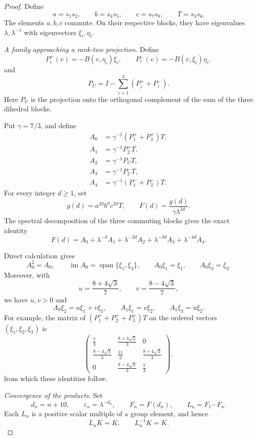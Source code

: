 \documentclass[11pt,reqno]{amsart}
\theoremstyle{plain}
\theoremstyle{definition}
\theoremstyle{remark}
\numberwithin{equation}{section}
\begin{document}
\begin{proof}
Define
\[
a=s_1s_2,
\qquad
b=s_4s_5,
\qquad
c=s_7s_8,
\qquad
T=s_3s_6.
\]
The elements $a,b,c$ commute. On their respective blocks,
they have eigenvalues $\lambda,\lambda^{-1}$ with
eigenvectors $\xi_i,\eta_i$.

\medskip
\noindent\textit{A family approaching a rank-two projection.}
Define
\[
P_i^+(v)=-B(v,\eta_i)\xi_i,
\qquad
P_i^-(v)=-B(v,\xi_i)\eta_i,
\]
and
\[
P_U=I-\sum_{i=1}^{3}(P_i^++P_i^-).
\]
Here $P_U$ is the projection onto the orthogonal complement of
the sum of the three dihedral blocks.

Put $\gamma=7/3$, and define
\[
\begin{aligned}
A_0&=\gamma^{-1}(P_1^++P_3^+)T,\\
A_1&=\gamma^{-1}P_2^+T,\\
A_2&=\gamma^{-1}P_UT,\\
A_3&=\gamma^{-1}P_2^-T,\\
A_4&=\gamma^{-1}(P_1^-+P_3^-)T.
\end{aligned}
\]
For every integer $d\ge1$, set
\[
g(d)=a^{2d}b^dc^{2d}T,
\qquad
F(d)=\frac{g(d)}{\gamma\lambda^{2d}}.
\]
The spectral decomposition of the three commuting blocks gives
the exact identity
\begin{equation}\label{eq:nonexposed-factor-expansion}
F(d)=
A_0+\lambda^{-d}A_1+\lambda^{-2d}A_2
+\lambda^{-3d}A_3+\lambda^{-4d}A_4.
\end{equation}

Direct calculation gives
\begin{equation}\label{eq:nonexposed-projection}
A_0^2=A_0,
\qquad
\operatorname{im}A_0=\operatorname{span}\{\xi_1,\xi_3\},
\qquad
A_0\xi_1=\xi_1,
\qquad
A_0\xi_3=\xi_3.
\end{equation}
Moreover, with
\[
u=\frac{8+4\sqrt3}{7},
\qquad
v=\frac{8-4\sqrt3}{7},
\]
we have $u,v>0$ and
\begin{equation}\label{eq:nonexposed-transitions}
A_0\xi_2=u\xi_1+v\xi_3,
\qquad
A_1\xi_1=v\xi_2,
\qquad
A_1\xi_3=u\xi_2.
\end{equation}
For example, the matrix of $(P_1^++P_2^++P_3^+)T$
on the ordered vectors $(\xi_1,\xi_2,\xi_3)$ is
\[
\begin{pmatrix}
\frac73&\frac{8+4\sqrt3}{3}&0\\
\frac{8-4\sqrt3}{3}&\frac{11}{3}&\frac{8+4\sqrt3}{3}\\
0&\frac{8-4\sqrt3}{3}&\frac73
\end{pmatrix},
\]
from which these identities follow.

\medskip
\noindent\textit{Convergence of the products.}
Set
\[
d_n=n+10,
\qquad
\varepsilon_n=\lambda^{-d_n},
\qquad
F_n=F(d_n),
\qquad
L_n=F_1\cdots F_n.
\]
Each $L_n$ is a positive scalar multiple of a group element,
and hence
\[
L_nK=K,
\qquad
L_n^{-1}K=K.
\]


\end{proof}
\end{document}
